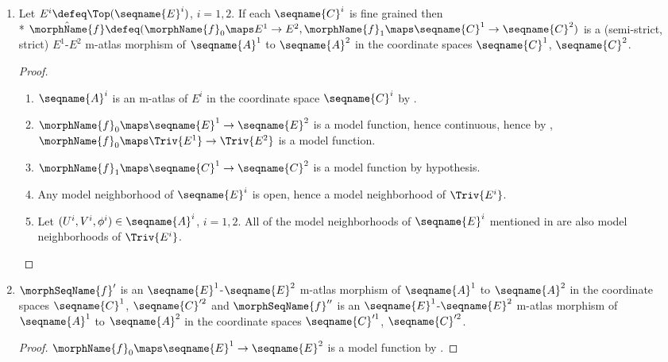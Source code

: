 \documentclass{article}
\begin{document}
\begin{lemma}
\begin{enumerate}
\item
\label{M-ATLmorph:fineistopmorph}
Let $E^i \defeq \Top(\seqname{E}^i)$, $i=1,2$. If each $\seqname{C}^i$
is fine grained then \\*
$
   \hat{\morphName{f}} \defeq
   (
      \morphName{f}_0 \maps E^1 \to E^2,
      \morphName{f}_1 \maps \seqname{C}^1 \to \seqname{C}^2
   )
$
is a (semi-strict, strict) $E^1$-$E^2$
m-atlas morphism of $\seqname{A}^1$ to $\seqname{A}^2$ in the
coordinate spaces $\seqname{C}^1$, $\seqname{C}^2$.

\begin{proof}
\leavevmode
\begin{enumerate}
\item
$\seqname{A}^i$ is an m-atlas of $E^i$ in the coordinate space
$\seqname{C}^i$ by .

\item
$\morphName{f}_0 \maps \seqname{E}^1 \to \seqname{E}^2$ is a model
function, hence continuous, hence by ,
$\morphName{f}_0 \maps \Triv{E^1} \to \Triv{E^2}$ is a model function.

\item
$\morphName{f}_1 \maps \seqname{C}^1 \to \seqname{C}^2$ is a model
function by hypothesis.

\item
Any model neighborhood of $\seqname{E}^i$ is open, hence a model
neighborhood of $\Triv{E^i}$.

\item
Let $(U^i,V^i,\phi^i) \in \seqname{A}^i$, $i=1,2$.  All of the model
neighborhoods of $\seqname{E}^i$ mentioned in
 are also
model neighborhoods of $\Triv{E^i}$.
\end{enumerate}
\end{proof}

\item
\label{M-ATLmorph:istosup}
$\morphSeqName{f}'$ is an $\seqname{E}^1$-$\seqname{E}^2$ m-atlas
morphism of $\seqname{A}^1$ to $\seqname{A}^2$ in the coordinate spaces
$\seqname{C}^1$, $\seqname{C}'^2$ and $\morphSeqName{f}''$ is an
$\seqname{E}^1$-$\seqname{E}^2$ m-atlas morphism of
$\seqname{A}^1$ to $\seqname{A}^2$ in the coordinate spaces
$\seqname{C}'^1$, $\seqname{C}'^2$.

\begin{proof}
$\morphName{f}_0 \maps \seqname{E}^1 \to \seqname{E}^2$ is a model
function by .


\end{proof}
\end{enumerate}
\end{lemma}
\end{document}
